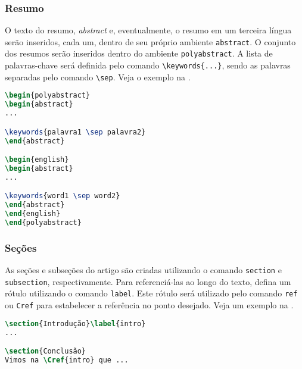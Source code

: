 \documentclass{textolivre}
\begin{document}
\subsubsection{Resumo}\label{sec-resumo}
O texto do resumo, \emph{abstract} e, eventualmente, o resumo em um terceira língua serão inseridos, cada um, 
dentro de seu próprio ambiente \verb|abstract|. O conjunto dos resumos serão inseridos dentro do ambiente \verb|polyabstract|.
A lista de palavras-chave será definida pelo comando \verb|\keywords{...}|, sendo as palavras separadas pelo
comando \verb|\sep|. Veja o exemplo na .
\begin{lstlisting}[language=tex, label=lst-abstract, caption={Como definir os resumos e palavras chaves em várias línguas.}]
\begin{polyabstract}
\begin{abstract}
...

\keywords{palavra1 \sep palavra2}
\end{abstract}

\begin{english}
\begin{abstract}
...

\keywords{word1 \sep word2}
\end{abstract}
\end{english}
\end{polyabstract}
\end{lstlisting} %


\subsubsection{Seções}\label{sec-secoes}
As seções e subseções do artigo são criadas utilizando o comando \verb|section|
e \verb|subsection|, respectivamente. Para referenciá-las ao longo do texto,
defina um rótulo utilizando o comando \verb|label|. Este rótulo será utilizado 
pelo comando \verb|ref| ou \verb|Cref| para estabelecer a referência no ponto desejado.
Veja um exemplo na .
\begin{lstlisting}[language=tex, label=lst-seclbl, caption={Seções, subseções e referências.}]
\section{Introdução}\label{intro}
...

\section{Conclusão}
Vimos na \Cref{intro} que ...
\end{lstlisting} %
\end{document}

